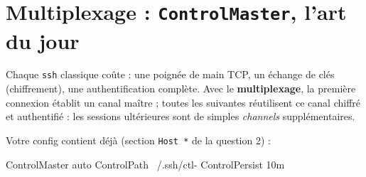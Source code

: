 \documentclass[a4paper,10pt]{exam}
\begin{document}
\section{Multiplexage : \texttt{ControlMaster}, l'art du jour}

Chaque \texttt{ssh} classique coûte : une poignée de main TCP, un échange de clés
(chiffrement), une authentification complète. Avec le \textbf{multiplexage}, la première
connexion établit un canal maître ; toutes les suivantes réutilisent ce canal chiffré et
authentifié : les sessions ultérieures sont de simples \emph{channels} supplémentaires.

Votre config contient déjà (section \texttt{Host *} de la question 2) :
\begin{bashcode}
ControlMaster auto
ControlPath ~/.ssh/ctl-%
ControlPersist 10m
\end{bashcode}
\end{document}
